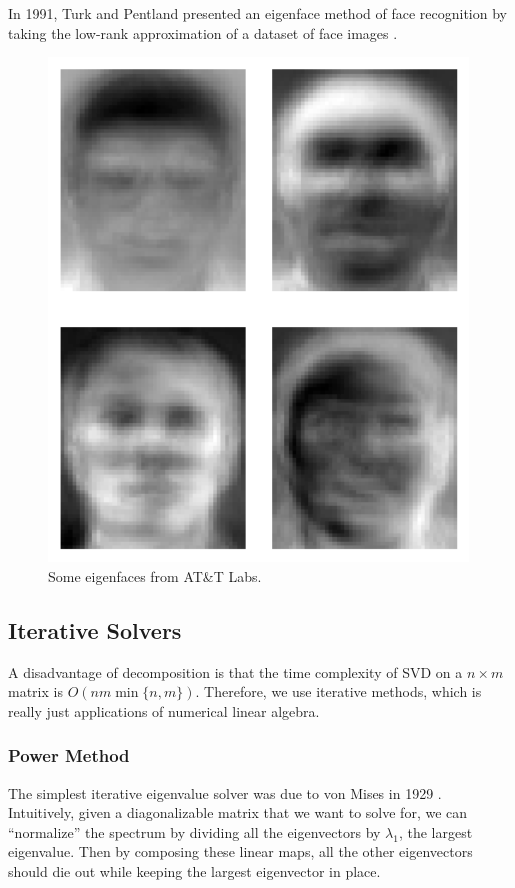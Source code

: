   \begin{example}[Eigenfaces]
    In 1991, Turk and Pentland presented an eigenface method of face recognition by taking the low-rank approximation of a dataset of face images \cite{1991turk}. 

    \begin{figure}[H]
      \centering 
      \includegraphics[scale=0.3]{img/eigenfaces.png}
      \caption{Some eigenfaces from AT\&T Labs. } 
      \label{fig:eigenfaces}
    \end{figure}
  \end{example}

\subsection{Iterative Solvers} 

  A disadvantage of decomposition is that the time complexity of SVD on a $n \times m$ matrix is $O(nm \min\{n, m\})$. Therefore, we use iterative methods, which is really just applications of numerical linear algebra. 

\subsubsection{Power Method} 

  The simplest iterative eigenvalue solver was due to von Mises in 1929 \cite{1929vonmises}. Intuitively, given a diagonalizable matrix that we want to solve for, we can  ``normalize'' the spectrum by dividing all the eigenvectors by $\lambda_1$, the largest eigenvalue. Then by composing these linear maps, all the other eigenvectors should die out while keeping the largest eigenvector in place. 

